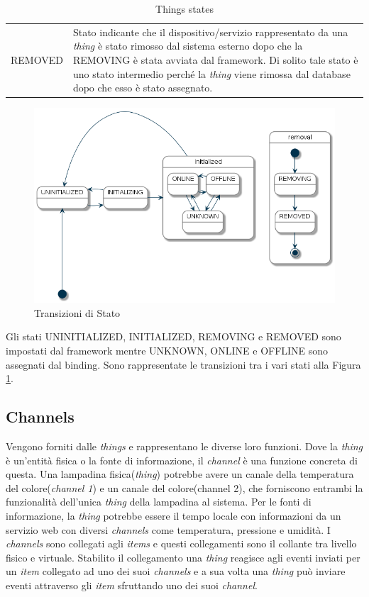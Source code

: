 \begin{table}[]
\begin{tabular}{ l | p{10cm} }
        REMOVED & Stato indicante che il dispositivo/servizio rappresentato da una {\em thing} è stato rimosso dal sistema esterno dopo che la REMOVING è stata avviata dal framework. Di solito tale stato è uno stato intermedio perché la {\em thing} viene rimossa dal database dopo che esso è stato assegnato.
    \end{tabular}
    \caption{Things states}
    \label{tab:things_states}
\end{table}

\begin{figure}
    \centering
    \includegraphics[width=12cm]{Immagini/status_transitions}
    \caption{Transizioni di Stato}
    \label{fig:status_transitions}
\end{figure}

Gli stati UNINITIALIZED, INITIALIZED, REMOVING e REMOVED sono impostati dal framework mentre UNKNOWN, ONLINE e OFFLINE sono assegnati dal binding. Sono rappresentate le transizioni tra i vari stati alla Figura \ref{fig:status_transitions}.

\subsection{Channels} Vengono forniti dalle {\em things} e rappresentano le diverse loro funzioni. Dove la {\em thing} è un'entità fisica o la fonte di informazione, il {\em channel} è una funzione concreta di questa. Una lampadina fisica({\em thing}) potrebbe avere un canale della temperatura del colore({\em channel 1}) e un canale del colore({channel 2}), che forniscono entrambi la funzionalità dell'unica {\em thing} della lampadina al sistema. Per le fonti di informazione, la {\em thing} potrebbe essere il tempo locale con informazioni da un servizio web con diversi {\em channels} come temperatura, pressione e umidità. I {\em channels} sono collegati agli {\em items} e questi collegamenti sono il collante tra livello fisico e virtuale. Stabilito il collegamento una {\em thing} reagisce agli eventi inviati per un {\em item} collegato ad uno dei suoi {\em channels} e a sua volta una {\em thing} può inviare eventi attraverso gli {\em item} sfruttando uno dei suoi {\em channel}.

